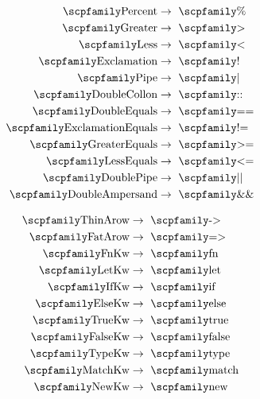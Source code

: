 \documentclass[
  oneside,
  english,
  coorientadorbanca,
  noabntexcite
]{ufsc-thesis-rn46-2019}
\newcommand{\code}[1]{\text{\scpfamily\setlength\spaceskip{0.35em}#1}}
\begin{document}
\begin{figure}[ht]
\begin{subfigure}[b]{0.3\textwidth}
\begin{minipage}{\textwidth}
\begin{align*}
        \code{Percent}           & \rightarrow \ \code{\%}   \\
        \code{Greater}           & \rightarrow \ \code{>}    \\
        \code{Less}              & \rightarrow \ \code{<}    \\
        \code{Exclamation}       & \rightarrow \ \code{!}    \\
        \code{Pipe}              & \rightarrow \ \code{|}    \\
        \code{DoubleCollon}      & \rightarrow \ \code{::}   \\
        \code{DoubleEquals}      & \rightarrow \ \code{==}   \\
        \code{ExclamationEquals} & \rightarrow \ \code{!=}   \\
        \code{GreaterEquals}     & \rightarrow \ \code{>=}   \\
        \code{LessEquals}        & \rightarrow \ \code{<=}   \\
        \code{DoublePipe}        & \rightarrow \ \code{||}   \\
        \code{DoubleAmpersand}   & \rightarrow \ \code{\&\&}
      \end{align*}
    \end{minipage}
  \end{subfigure}
  \begin{subfigure}[b]{0.3\textwidth}
    \small
    \begin{minipage}{\textwidth}
      \begin{align*}
        \code{ThinArow} & \rightarrow \ \code{->}    \\
        \code{FatArow}  & \rightarrow \ \code{=>}    \\
        \code{FnKw}     & \rightarrow \ \code{fn}    \\
        \code{LetKw}    & \rightarrow \ \code{let}   \\
        \code{IfKw}     & \rightarrow \ \code{if}    \\
        \code{ElseKw}   & \rightarrow \ \code{else}  \\
        \code{TrueKw}   & \rightarrow \ \code{true}  \\
        \code{FalseKw}  & \rightarrow \ \code{false} \\
        \code{TypeKw}   & \rightarrow \ \code{type}  \\
        \code{MatchKw}  & \rightarrow \ \code{match} \\
        \code{NewKw}    & \rightarrow \ \code{new}

\end{align*}
\end{minipage}
\end{subfigure}
\end{figure}
\end{document}
